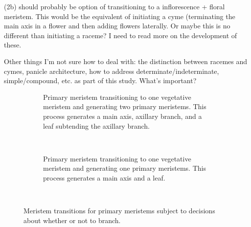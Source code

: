 \documentclass[12pt, oneside]{article}   	%
\begin{document}
(2b) should probably be option of transitioning to a inflorescence + floral meristem. This would be the equivalent of initiating a cyme (terminating the main axis in a flower and then adding flowers laterally. Or maybe this is no different than initiating a raceme? I need to read more on the development of these. 

Other things I'm not sure how to deal with: the distinction between racemes and cymes, panicle architecture, how to address determinate/indeterminate, simple/compound, etc. as part of this study. What's important?

\newpage

\begin{figure}[hbt!]
  \begin{subfigure}[h]{.45\textwidth}
    \centering
          \caption{Primary meristem transitioning to one vegetative meristem and generating two primary meristems. This process generates a main axis, axillary branch, and a leaf subtending the axillary branch.} 
  \end{subfigure}\
                \hspace{\fill}
   \begin{subfigure}[h]{.45\textwidth}
    \centering
          \caption{Primary meristem transitioning to one vegetative meristem and generating one primary meristems. This process generates a main axis and a leaf. } 
  \end{subfigure}\
        \caption{Meristem transitions for primary meristems subject to decisions about whether or not to branch.}
        \label{fig:transitions-1}
\end{figure}
\end{document}
